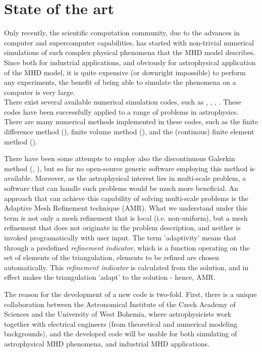 \section{State of the art}
Only recently, the scientific computation community, due to the advances in computer and supercomputer capabilities, has started with non-trivial numerical simulations of such complex physical phenomena that the MHD model describes. Since both for industrial applications, and obviously for astrophysical application of the MHD model, it is quite expensive (or downright impossible) to perform any experiments, the benefit of being able to simulate the phenomena on a computer is very large.\\
There exist several available numerical simulation codes, such as \citep{athena}, \citep{zeus}, \citep{ramses}, \citep{honzaFD}. These codes have been successfully applied to a range of problems in astrophysics.\\
There are many numerical methods implemented in these codes, such as the finite difference method (\citep{honzaFD}), finite volume method (\citep{ramses}), and the (continous) finite element method (\citep{honzaFem}).

There have been some attempts to employ also the discontinuous Galerkin method (\citep{mhdDg}, \citep{mhdDg2}), but so far no open-source generic software employing this method is available. Moreover, as the astrophysical interest lies in multi-scale problem, a software that can handle such problems would be much more beneficial. An approach that can achieve this capability of solving multi-scale problems is the Adaptive Mesh Refinement technique (AMR). What we understand under this term is not only a mesh refinement that is local (i.e. non-uniform), but a mesh refinement that does not originate in the problem description, and neither is invoked programatically with user input. The term 'adaptivity' means that through a predefined \textit{refinement indicator}, which is a function operating on the set of elements of the triangulation, elements to be refined are chosen automatically. This \textit{refinement indicator} is calculated from the solution, and in effect makes the triangulation 'adapt' to the solution - hence, AMR.

The reason for the development of a new code is two-fold. First, there is a unique collaboration between the Astronomical Institute of the Czech Academy of Sciences and the University of West Bohemia, where astrophysicists work together with electrical engineers (from theoretical and numerical modeling backgrounds), and the developed code will be usable for both simulating of astrophysical MHD phenomena, and industrial MHD applications.
